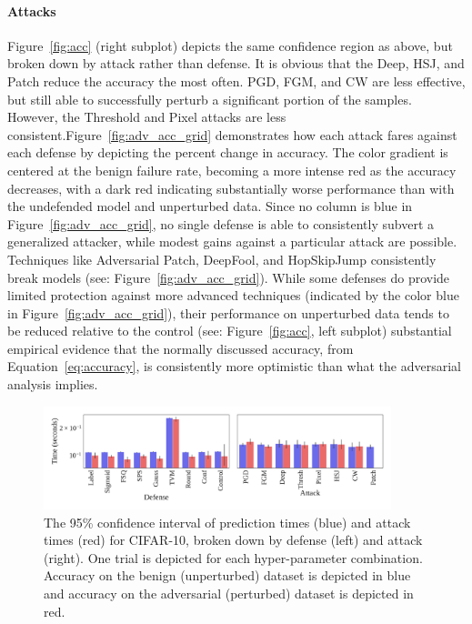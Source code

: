 \documentclass[journal]{IEEEtran}
\begin{document}
\paragraph{Attacks}
    Figure~\ref{fig:acc} (right subplot) depicts the same confidence region as above, but broken down by attack rather than defense. It is obvious that the Deep, HSJ, and Patch reduce the accuracy the most often. PGD, FGM, and CW are less effective, but still able to successfully perturb a significant portion of the samples. However, the Threshold and Pixel attacks are less consistent.Figure~\ref{fig:adv_acc_grid} demonstrates how each attack fares against each defense by depicting the percent change in accuracy. The color gradient is centered at the benign failure rate, becoming a more intense red as the accuracy decreases, with a dark red indicating substantially worse performance than with the undefended model and unperturbed data. Since no column is blue in Figure~\ref{fig:adv_acc_grid}, no single defense is able to consistently subvert a generalized attacker, while modest gains against a particular attack are possible. Techniques like Adversarial Patch, DeepFool, and HopSkipJump consistently break models (see: Figure~\ref{fig:adv_acc_grid}). While some defenses do provide limited protection against more advanced techniques (indicated by the color blue in Figure~\ref{fig:adv_acc_grid}), their performance on unperturbed data tends to be reduced relative to the control (see: Figure~\ref{fig:acc}, left subplot) substantial empirical evidence that the normally discussed accuracy, from Equation~\ref{eq:accuracy}, is consistently more optimistic than what the adversarial analysis implies.

\begin{figure}[!hptb]
    {\centering
    \includegraphics[trim={0 0.85em 0 0.35em},clip,width=0.9\textwidth]{Fig13.pdf}
    \vspace{-1em}
    \caption{The 95\% confidence interval of prediction times (blue) and attack times (red) for CIFAR-10, broken down by defense (left) and attack (right). One trial is depicted for each hyper-parameter combination. Accuracy on the benign (unperturbed) dataset is depicted in blue and accuracy on the adversarial (perturbed) dataset is depicted in red.}
    \label{fig:time}
    } %
\end{figure}
\end{document}
